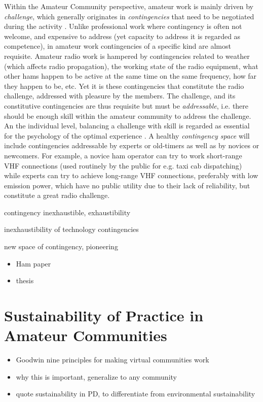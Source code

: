 \documentclass{acm_proc_article-sp}
\begin{document}
Within the Amateur Community perspective, amateur work is mainly driven by \textit{challenge}, which generally originates in \textit{contingencies} that need to be negotiated during the activity \cite{bogdan_bowers07}. Unlike professional work where contingency is often not welcome, and expensive to address (yet capacity to address it is regarded as competence), in amateur work contingencies of a specific kind are almost requisite. Amateur radio work is hampered by contingencies related to weather (which affects radio propagation), the working state of the radio equipment, what other hams happen to be active at the same time on the same frequency, how far they happen to be, etc. Yet it is these contingencies that constitute the radio challenge, addressed with pleasure by the members. The challenge, and its constitutive contingencies are thus requisite but must be \textit{addressable}, i.e. there should be enough skill within  the amateur community to address the challenge. An the individual level, balancing a challenge with skill is regarded as essential for the psychology of the optimal experience \cite{csik90}. A healthy \textit{contingency space} will include contingencies addressable by experts or old-timers as well as by novices or newcomers. For example, a novice ham operator can try to work short-range VHF connections (used routinely by the public for e.g. taxi cab dispatching)  while experts can try to achieve long-range VHF connections, preferably with low emission power, which have no public utility due to their lack of reliability, but constitute a great radio challenge.  

contingency inexhaustible, exhaustibility

inexhaustibility of technology contingencies

new space of contingency, pioneering

\begin{itemize}
\item Ham paper
\item thesis
\end{itemize}

\section{Sustainability of Practice in Amateur Communities}\label{sec:sust}
\begin{itemize}
\item Goodwin nine principles for making virtual communities work
\item why this is important, generalize to any community
\item quote sustainability in PD, to differentiate from environmental sustainability
\end{itemize}
\end{document}
